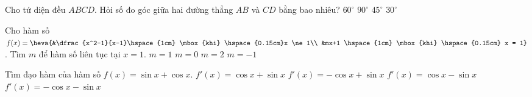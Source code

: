 \begin{ex}%
	Cho tứ diện đều $ABCD$. Hỏi số đo góc giữa hai đường thẳng $AB$ và $CD$ bằng bao nhiêu?
	\choice
	{$60^{\circ}$}
	{\True $90^{\circ}$}
	{$45^{\circ}$}
	{$30^{\circ}$}
\end{ex}

\begin{ex}%
	Cho hàm số $f(x)=\heva{&\dfrac{x^2-1}{x-1}\hspace{1cm} \mbox{khi} \hspace{0.15cm}x \ne 1\\ &mx+1 \hspace{1cm} \mbox{khi} \hspace{0.15cm} x = 1}$. Tìm $m$ để hàm số liên tục tại $x=1$.
	\choice
	{\True $m=1$}
	{$m=0$}
	{$m=2$}
	{$m=-1$}
\end{ex}

\begin{ex}%
	Tìm đạo hàm của hàm số $f(x)=\sin x+\cos x$.
	\choice
	{$f'(x)=\cos x+\sin x$}
	{$f'(x)=-\cos x+\sin x$}
	{\True $f'(x)=\cos x-\sin x$}
	{$f'(x)=-\cos x-\sin x$}
\end{ex}

